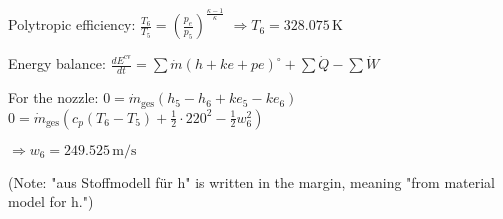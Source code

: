 Polytropic efficiency:  
\( \frac{T_6}{T_5} = \left( \frac{p_e}{p_5} \right)^{\frac{\kappa - 1}{\kappa}} \)  
\( \Rightarrow T_6 = 328.075 \, \text{K} \)  

Energy balance:  
\( \frac{dE^{\text{cv}}}{dt} = \sum \dot{m} (h + ke + pe)^{\circ} + \sum \dot{Q} - \sum \dot{W} \)  

For the nozzle:  
\( 0 = \dot{m}_{\text{ges}} (h_5 - h_6 + ke_5 - ke_6) \)  
\( 0 = \dot{m}_{\text{ges}} \left( c_p (T_6 - T_5) + \frac{1}{2} \cdot 220^2 - \frac{1}{2} w_6^2 \right) \)  

\( \Rightarrow w_6 = 249.525 \, \text{m/s} \)  

(Note: "aus Stoffmodell für h" is written in the margin, meaning "from material model for h.")